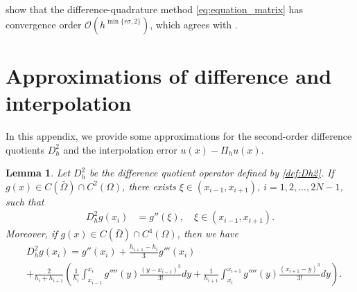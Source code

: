 \documentclass{amsart}
\newtheorem{lemma}[theorem]{Lemma}
\theoremstyle{definition}
\theoremstyle{remark}
\numberwithin{equation}{section}
\begin{document}
 show that the difference-quadrature method \eqref{eq:equation_matrix} has convergence order
$\mathcal{O}(h^{\min \{r\sigma, 2\}})$, which agrees with .











\appendix

\section{Approximations of difference and interpolation}
In this appendix, we provide some approximations for the second-order difference quotients $D_h^2$ and the interpolation error $u(x)-\Pi_h u(x)$.
\begin{lemma} \label{lmm:Dh2simd2}
  Let $D_h^2$ be the difference quotient operator defined by \eqref{def:Dh2}.
  If \(g(x)\in C(\bar{\Omega}) \cap C^2(\Omega)\),
  there exists \(\xi\in (x_{i-1}, x_{i+1})\), $i=1, 2, ..., 2N-1$, such that
  \begin{equation*} \label{eq:Dh2simd2}
    \begin{aligned}
      D_h^2 g(x_i) & = g''(\xi), \quad \xi \in (x_{i-1}, x_{i+1}).
    \end{aligned}
  \end{equation*}
  Moreover, if \(g(x) \in C(\bar{\Omega}) \cap C^4(\Omega)\), then we have
  \begin{equation*} \label{eq:Dh2simd4}
    \begin{aligned}
      & D_h^2 g(x_i) = g''(x_{i}) + \frac{h_{i+1}-h_{i}}{3} g'''(x_{i}) \\
      &  +  \frac{2}{h_i + h_{i+1}}\left( \frac{1}{h_{i}}\int_{x_{i-1}}^{x_i} g''''(y) \frac{(y-x_{i-1})^3}{3!} dy + \frac{1}{h_{i+1}} \int_{x_i}^{x_{i+1}} g''''(y) \frac{(x_{i+1}-y)^3}{3!} dy \right) .
    \end{aligned}
  \end{equation*}
\end{lemma}
\end{document}
